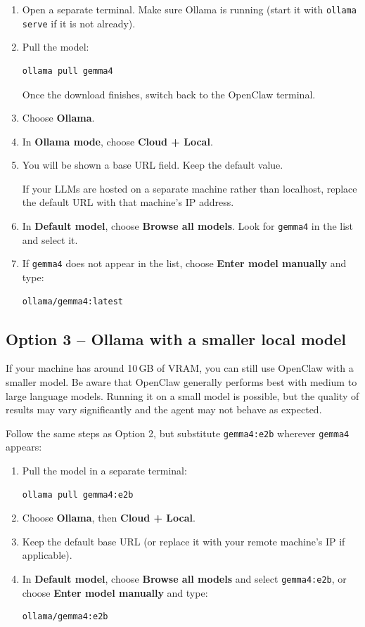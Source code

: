 \documentclass[12pt, a4paper]{article}
\begin{document}
\begin{enumerate}[leftmargin=1.5em]
\item Open a separate terminal. Make sure Ollama is running (start it with \texttt{ollama serve} if it is not already).
\item Pull the model:
\begin{lstlisting}[style=shellstyle]
ollama pull gemma4
\end{lstlisting}
Once the download finishes, switch back to the OpenClaw terminal.
\item Choose \textbf{Ollama}.
\item In \textbf{Ollama mode}, choose \textbf{Cloud + Local}.
\item You will be shown a base URL field. Keep the default value.
\begin{notebox}
If your LLMs are hosted on a separate machine rather than localhost, replace the default URL with that machine's IP address.
\end{notebox}
\item In \textbf{Default model}, choose \textbf{Browse all models}. Look for \texttt{gemma4} in the list and select it.
\item If \texttt{gemma4} does not appear in the list, choose \textbf{Enter model manually} and type:
\begin{lstlisting}[style=plainstyle]
ollama/gemma4:latest
\end{lstlisting}
\end{enumerate}

\subsection{Option 3 -- Ollama with a smaller local model}

If your machine has around 10\,GB of VRAM, you can still use OpenClaw with a smaller model. Be aware that OpenClaw generally performs best with medium to large language models. Running it on a small model is possible, but the quality of results may vary significantly and the agent may not behave as expected.

Follow the same steps as Option 2, but substitute \texttt{gemma4:e2b} wherever \texttt{gemma4} appears:

\begin{enumerate}[leftmargin=1.5em]
\item Pull the model in a separate terminal:
\begin{lstlisting}[style=shellstyle]
ollama pull gemma4:e2b
\end{lstlisting}
\item Choose \textbf{Ollama}, then \textbf{Cloud + Local}.
\item Keep the default base URL (or replace it with your remote machine's IP if applicable).
\item In \textbf{Default model}, choose \textbf{Browse all models} and select \texttt{gemma4:e2b}, or choose \textbf{Enter model manually} and type:
\begin{lstlisting}[style=plainstyle]
ollama/gemma4:e2b
\end{lstlisting}
\end{enumerate}
\end{document}
